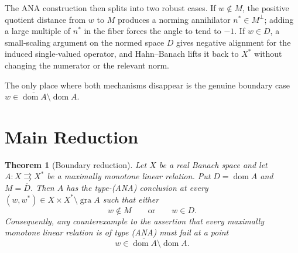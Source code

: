 \documentclass[11pt]{article}
\newtheorem{theorem}{Theorem}
\newcommand{\gra}{\operatorname{gra}}
\newcommand{\dom}{\operatorname{dom}}
\begin{document}
The ANA construction then splits into two robust cases. If
\(w\notin M\), the positive quotient distance from \(w\) to \(M\)
produces a norming annihilator \(n^*\in M^\perp\); adding a large
multiple of \(n^*\) in the fiber forces the angle to tend to \(-1\). If
\(w\in D\), a small-scaling argument on the normed space \(D\) gives
negative alignment for the induced single-valued operator, and
Hahn--Banach lifts it back to \(X^*\) without changing the numerator or
the relevant norm.

The only place where both mechanisms disappear is the genuine boundary
case \(w\in\overline{\dom A}\setminus\dom A\).

\section*{Main Reduction}

\begin{theorem}[Boundary reduction]
Let \(X\) be a real Banach space and let \(A:X\rightrightarrows X^*\) be
a maximally monotone linear relation. Put \(D=\dom A\) and
\(M=\overline D\). Then \(A\) has the type-(ANA) conclusion at every
\((w,w^*)\in X\times X^*\setminus\gra A\) such that either
\[
w\notin M \qquad\text{or}\qquad w\in D.
\]
Consequently, any counterexample to the assertion that every maximally
monotone linear relation is of type (ANA) must fail at a point
\[
w\in \overline{\dom A}\setminus\dom A.
\]
\end{theorem}
\end{document}

